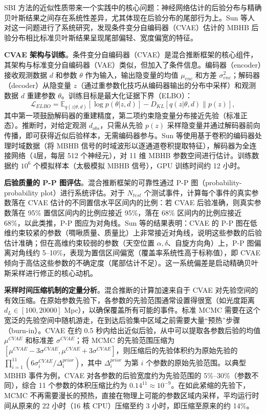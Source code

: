 SBI 方法的近似性质带来一个实践中的核心问题：神经网络估计的后验分布与精确贝叶斯结果之间存在系统性差异，尤其体现在后验分布的尾部行为上。Sun 等人~\cite{sun2025cvae} 对这一问题进行了系统研究，发现条件变分自编码器（CVAE）估计的 MBHB 后验分布相比标准贝叶斯结果呈现尾部偏轻、宽度偏宽的特征。

\textbf{CVAE 架构与训练}。条件变分自编码器（CVAE）是混合推断框架的核心组件，其架构与标准变分自编码器（VAE）类似，但加入了条件信息。编码器（encoder）接收观测数据 $d$ 和参数 $\theta$ 作为输入，输出隐变量的均值 $\mu_{enc}$ 和方差 $\sigma_{enc}^2$；解码器（decoder）从隐变量 $z$（通过重参数化技巧从编码器输出的分布中采样）和观测数据 $d$ 重建参数 $\theta$。训练目标是最大化证据下界（ELBO）：
\begin{equation}
  \mathcal{L}_{ELBO} = \mathbb{E}_{q(z|\theta,d)}[\log p(\theta|z,d)] - D_{KL}[q(z|\theta,d) \| p(z)],
\end{equation}
其中第一项鼓励解码器的重建精度，第二项约束隐变量分布接近先验（标准正态）。推断时，对给定观测 $d_{obs}$，只需从先验 $p(z)$ 采样隐变量并通过解码器前向传播，即可获得近似后验样本，无需编码器参与。Sun 等使用基于卷积的编码器处理时域数据（将 MBHB 信号的时域波形以逐通道卷积提取特征），解码器为全连接网络（4层，每层 512 个神经元），对 11 维 MBHB 参数空间进行估计。训练数据约 $10^6$ 个模拟样本（太极模拟 MBHB 信号），GPU 训练时间约 12 小时。

\textbf{后验质量的 P-P 图评估}。混合推断框架的可靠性通过 P-P 图（probability-probability plot）进行系统评估。对于 $N_{test}$ 个测试事件，计算每个事件的真实参数落在 CVAE 估计的不同置信水平区间内的比例：若 CVAE 后验准确，则真实参数落在 95\% 置信区间内的比例应接近 95\%，落在 68\% 区间内的比例应接近 68\%，以此类推，P-P 图应为对角线。Sun 等的结果表明：CVAE 的 P-P 图在低维约束较紧的参数（啁啾质量、质量比）上非常接近对角线，说明这些参数的后验估计准确；但在高维约束较弱的参数（天空位置 $\alpha, \delta$、自旋方向角）上，P-P 图偏离对角线约 5--10\%，表现为置信区间偏宽（覆盖率系统性高于标称值），即 CVAE 倾向于高估这些参数的不确定度（尾部估计不足）。这一系统偏差是启动精确贝叶斯采样进行修正的核心动机。

\textbf{采样时间压缩机制的定量分析}。混合推断的计算加速来自于 CVAE 对先验空间的有效压缩。在原始参数先验下，各参数的先验范围通常设置得很宽（如光度距离 $d_L \in [100, 20000]$ Mpc），以确保覆盖所有可能的事件。标准 MCMC 需要在这个宽泛的先验空间中随机游走，在到达后验集中区域之前需要大量“预热”步骤（burn-in）。CVAE 在约 0.5 秒内给出近似后验，从中可以提取各参数后验的均值 $\mu^{CVAE}$ 和标准差 $\sigma^{CVAE}$；将 MCMC 的先验范围压缩为 $[\mu^{CVAE} - 3\sigma^{CVAE}, \mu^{CVAE} + 3\sigma^{CVAE}]$，则压缩后的先验体积约为原始先验的 $\prod_{i=1}^{11} (6\sigma_i^{CVAE} / \Delta_i^{prior})$，其中 $\Delta_i^{prior}$ 为第 $i$ 个参数的原始先验范围。以典型 MBHB 事件为例，CVAE 对各参数的后验宽度约为先验范围的 5\%--30\%（参数不同），综合 11 个参数的体积压缩比约为 $0.14^{11} \approx 10^{-9}$。在如此紧缩的先验下，MCMC 不再需要漫长的预热，直接在物理上可能的参数区域内采样，平均运行时间从原来的 22 小时（16 核 CPU）压缩至约 3 小时，即压缩至原来的约 14\%。

